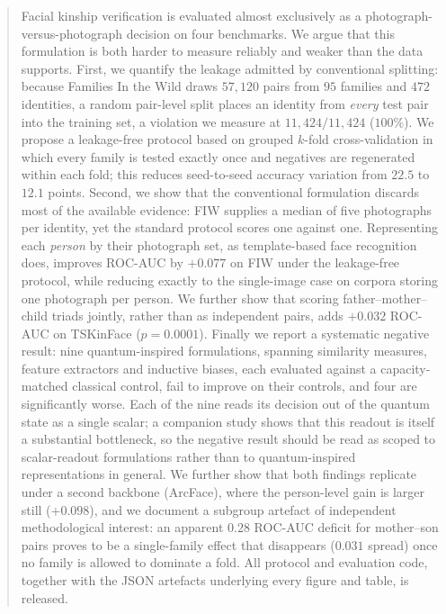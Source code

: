 \documentclass[journal,12pt]{IEEEtran}
\begin{document}
\begin{abstract}
Facial kinship verification is evaluated almost exclusively as a
photograph-versus-photograph decision on four benchmarks. We argue that this
formulation is both harder to measure reliably and weaker than the data
supports. First, we quantify the leakage admitted by conventional splitting:
because Families In the Wild draws $57{,}120$ pairs from $95$ families and
$472$ identities, a random pair-level split places an identity from
\emph{every} test pair into the training set, a violation we measure at
$11{,}424/11{,}424$ ($100\%$). We propose a leakage-free protocol based on
grouped $k$-fold cross-validation in which every family is tested exactly once
and negatives are regenerated within each fold; this reduces seed-to-seed
accuracy variation from $22.5$ to $12.1$ points. Second, we show that the
conventional formulation discards most of the available evidence: FIW supplies
a median of five photographs per identity, yet the standard protocol scores one
against one. Representing each \emph{person} by their photograph set, as
template-based face recognition does, improves ROC-AUC by $+0.077$ on FIW under
the leakage-free protocol, while reducing exactly to the single-image case on
corpora storing one photograph per person. We further show that scoring
father--mother--child triads jointly, rather than as independent pairs, adds
$+0.032$ ROC-AUC on TSKinFace ($p = 0.0001$). Finally we report a systematic
negative result: nine quantum-inspired formulations, spanning similarity
measures, feature extractors and inductive biases, each evaluated against a
capacity-matched classical control, fail to improve on their controls, and four
are significantly worse. Each of the nine reads its decision out of the quantum
state as a single scalar; a companion study shows that this readout is itself a
substantial bottleneck, so the negative result should be read as scoped to
scalar-readout formulations rather than to quantum-inspired representations in
general. We further show that both findings replicate under a second backbone
(ArcFace), where the person-level gain is larger still ($+0.098$), and we
document a subgroup artefact of independent methodological interest: an
apparent $0.28$ ROC-AUC deficit for mother--son pairs proves to be a
single-family effect that disappears ($0.031$ spread) once no family is allowed
to dominate a fold. All protocol and evaluation code,
together with the JSON artefacts underlying every figure and table, is
released.
\end{abstract}
\end{document}
